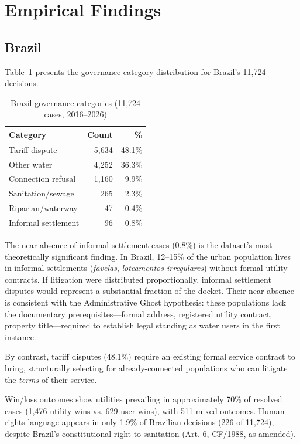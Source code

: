 \documentclass[12pt]{article}
\begin{document}
\section{Empirical Findings}

\subsection{Brazil}

Table~\ref{tab:brazil} presents the governance category distribution for Brazil's 11,724 decisions.

\begin{table}[h]
\centering
\caption{Brazil governance categories (11,724 cases, 2016--2026)}
\label{tab:brazil}
\begin{tabular}{@{}lrr@{}}
\toprule
Category & Count & \% \\
\midrule
Tariff dispute & 5,634 & 48.1\% \\
Other water & 4,252 & 36.3\% \\
Connection refusal & 1,160 & 9.9\% \\
Sanitation/sewage & 265 & 2.3\% \\
Riparian/waterway & 47 & 0.4\% \\
Informal settlement & 96 & 0.8\% \\
\bottomrule
\end{tabular}
\end{table}

The near-absence of informal settlement cases (0.8\%) is the dataset's most theoretically significant finding. In Brazil, 12--15\% of the urban population lives in informal settlements (\emph{favelas}, \emph{loteamentos irregulares}) without formal utility contracts. If litigation were distributed proportionally, informal settlement disputes would represent a substantial fraction of the docket. Their near-absence is consistent with the Administrative Ghost hypothesis: these populations lack the documentary prerequisites—formal address, registered utility contract, property title—required to establish legal standing as water users in the first instance.

By contrast, tariff disputes (48.1\%) require an existing formal service contract to bring, structurally selecting for already-connected populations who can litigate the \emph{terms} of their service.

Win/loss outcomes show utilities prevailing in approximately 70\% of resolved cases (1,476 utility wins vs. 629 user wins), with 511 mixed outcomes. Human rights language appears in only 1.9\% of Brazilian decisions (226 of 11,724), despite Brazil's constitutional right to sanitation (Art. 6, CF/1988, as amended).
\end{document}
